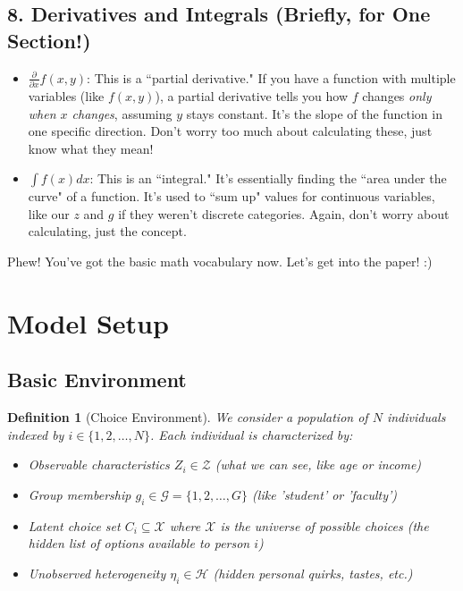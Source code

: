 \documentclass{article}
\newtheorem{definition}{Definition}
\newcommand{\X}{\mathcal{X}}
\newcommand{\G}{\mathcal{G}}
\begin{document}
\subsection*{8. Derivatives and Integrals (Briefly, for One Section!)}
\begin{itemize}
    \item $\frac{\partial}{\partial x} f(x,y)$: This is a ``partial derivative." If you have a function with multiple variables (like $f(x,y)$), a partial derivative tells you how $f$ changes \textit{only when $x$ changes}, assuming $y$ stays constant. It's the slope of the function in one specific direction. Don't worry too much about calculating these, just know what they mean!
    \item $\int f(x) dx$: This is an ``integral." It's essentially finding the ``area under the curve" of a function. It's used to ``sum up" values for continuous variables, like our $z$ and $g$ if they weren't discrete categories. Again, don't worry about calculating, just the concept.
\end{itemize}

Phew! You've got the basic math vocabulary now. Let's get into the paper! :)







\section{Model Setup}
\subsection{Basic Environment}

\begin{definition}[Choice Environment]
We consider a population of $N$ individuals indexed by $i \in \{1, 2, \ldots, N\}$. Each individual is characterized by:
\begin{itemize}
    \item Observable characteristics $Z_i \in \mathcal{Z}$ (what we can see, like age or income)
    \item Group membership $g_i \in \G = \{1, 2, \ldots, G\}$ (like 'student' or 'faculty')
    \item Latent choice set $C_i \subseteq \X$ where $\X$ is the universe of possible choices (the hidden list of options available to person $i$)
    \item Unobserved heterogeneity $\eta_i \in \mathcal{H}$ (hidden personal quirks, tastes, etc.)
\end{itemize}
\end{definition}
\end{document}
